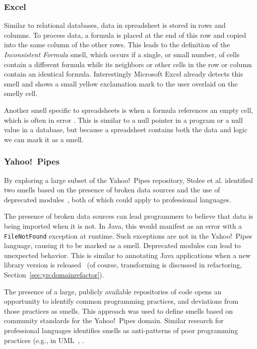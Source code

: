 \documentclass[10pt,conference,compsocconf]{IEEEtran}
\begin{document}
\subsubsection{Excel}

Similar to relational databases, data in spreadsheet is stored in rows and columns.
To process data, a formula is placed at the end of this row and copied into the same column of the other rows.
This leads to the definition of the \emph{Inconsistent Formula} smell, which occurs if a single, or small number, of cells contain a different formula while its neighbors or other cells in the row or column contain an identical formula.
Interestingly Microsoft Excel already detects this smell and shows a small yellow exclamation mark to the user overlaid on the smelly cell.

Another smell specific to spreadsheets is when a formula references an empty cell, which is often in error \cite{cunha2012towards}.
This is similar to a null pointer in a program or a null value in a database, but because a spreadsheet contains both the data and logic we can mark it as a smell.

\subsubsection{Yahoo!\ Pipes}
By exploring a large subset of the Yahoo!\ Pipes repository, Stolee et al. identified two smells based on the presence of broken data sources and the use of deprecated modules~\cite{StoleeTSE2013}, both of which could apply to professional languages.

The presence of broken data sources can lead programmers to believe that data is being imported when it is not.  In Java, this would manifest as an error with a {\tt FileNotFound} exception at runtime. Such exceptions are not in the Yahoo!\ Pipes language, causing it to be marked as a smell. 
Deprecated modules can lead to unexpected behavior. 
This is similar to annotating Java applications when a new library version is released~\cite{Tansey:2008:ARI:1449955.1449788} (of course, transforming is discussed in refactoring, Section~\ref{sec:yp:domainrefactor}).

The presence of a large, publicly available repositories of code opens an opportunity to identify common programming practices, and deviations from those practices as smells. This approach was used to define smells based on community standards for the Yahoo!\ Pipes domain. 
Similar research for professional languages identifies smells  as anti-patterns of poor programming practices (e.g., in UML~\cite{Enckevort:2009:RUM:1639950.1639959}, . 
\end{document}
